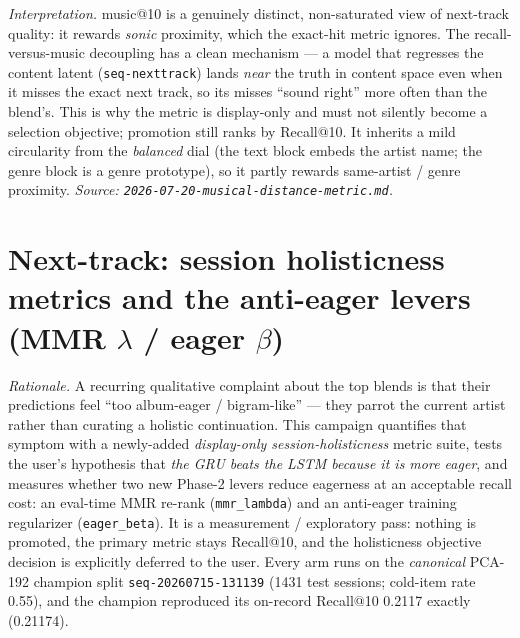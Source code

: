 \documentclass[11pt]{article}
\newcommand{\dsid}[1]{\texttt{\small #1}}
\begin{document}
\emph{Interpretation.} music@10 is a genuinely distinct, non-saturated view of
next-track quality: it rewards \emph{sonic} proximity, which the exact-hit metric
ignores. The recall-versus-music decoupling has a clean mechanism --- a model that
regresses the content latent (\texttt{seq-nexttrack}) lands \emph{near} the truth in
content space even when it misses the exact next track, so its misses ``sound
right'' more often than the blend's. This is why the metric is display-only and must
not silently become a selection objective; promotion still ranks by Recall@10. It
inherits a mild circularity from the \emph{balanced} dial (the text block embeds the
artist name; the genre block is a genre prototype), so it partly rewards
same-artist / genre proximity.
\emph{Source: \texttt{2026-07-20-musical-distance-metric.md}.}

\section{Next-track: session holisticness metrics and the anti-eager levers (MMR $\lambda$ / eager $\beta$)}
\label{sec:nexttrack-holisticness}
\emph{Rationale.} A recurring qualitative complaint about the top blends is that
their predictions feel ``too album-eager / bigram-like'' --- they parrot the
current artist rather than curating a holistic continuation. This campaign
quantifies that symptom with a newly-added \emph{display-only session-holisticness}
metric suite, tests the user's hypothesis that \emph{the GRU beats the LSTM because
it is more eager}, and measures whether two new Phase-2 levers reduce eagerness at
an acceptable recall cost: an eval-time MMR re-rank (\texttt{mmr\_lambda}) and an
anti-eager training regularizer (\texttt{eager\_beta}). It is a measurement /
exploratory pass: nothing is promoted, the primary metric stays Recall@10, and the
holisticness objective decision is explicitly deferred to the user. Every arm runs
on the \emph{canonical} PCA-192 champion split \dsid{seq-20260715-131139}
(\num{1431} test sessions; cold-item rate \num{0.55}), and the champion reproduced
its on-record Recall@10 \num{0.2117} exactly (\num{0.21174}).
\end{document}
